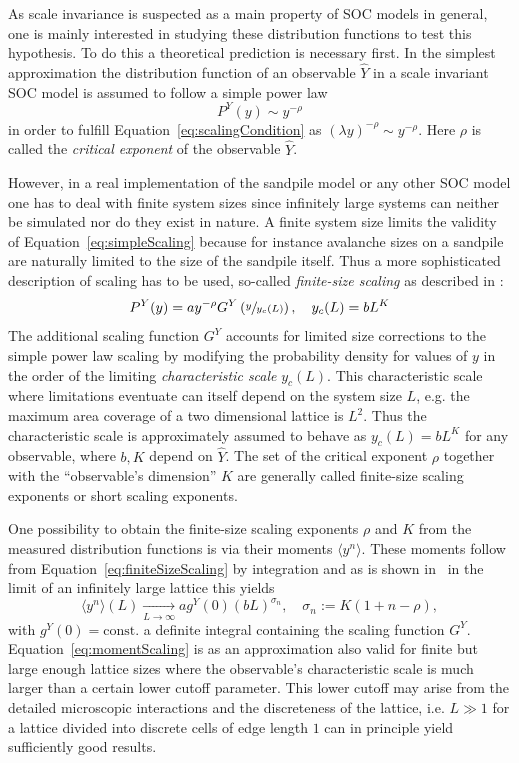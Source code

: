 As scale invariance is suspected as a main property of SOC models in general, one is mainly interested in studying
these distribution functions to test this hypothesis. To do this a theoretical prediction is necessary first.
In the simplest approximation the distribution function of an observable $\hat{Y}$ in a scale invariant SOC model
is assumed to follow a simple power law
\begin{equation}\label{eq:simpleScaling}
P^{Y}(y) \sim y^{-\rho}
\end{equation}
in order to fulfill Equation~\eqref{eq:scalingCondition} as $(\lambda y)^{-\rho}\sim y^{-\rho}$.
Here $\rho$ is called the \emph{critical exponent} of the observable $\hat{Y}$.

However, in a real implementation of the sandpile model or any other SOC model one has to deal with finite system sizes
since infinitely large systems can neither be simulated nor do they exist in nature.
A finite system size limits the validity of Equation~\eqref{eq:simpleScaling} because for instance avalanche sizes on a
sandpile are naturally limited to the size of the sandpile itself. Thus a more sophisticated description of scaling
has to be used, so-called \emph{finite-size scaling} as described in \cite{SOC-book}:
\begin{equation}\label{eq:finiteSizeScaling}
P^{Y}(y) = a y^{-\rho} G^{Y}\left(\sfrac{y}{y_c(L)}\right), \quad y_c(L)=b L^K
\end{equation}
The additional scaling function $G^{Y}$ accounts for limited size corrections to the simple power law scaling
by modifying the probability density for values of $y$ in the order of the limiting \emph{characteristic scale}
$y_c(L)$. This characteristic scale where limitations eventuate can itself depend on the system size $L$,
e.g. the maximum area coverage of a two dimensional lattice is $L^2$. Thus the characteristic scale is approximately
assumed to behave as $y_c(L)=b L^K$ for any observable, where $b,K$ depend on $\hat{Y}$.
The set of the critical exponent $\rho$ together with the \enquote{observable's dimension} $K$ are
generally called finite-size scaling exponents or short scaling exponents.

One possibility to obtain the finite-size scaling exponents $\rho$ and $K$ from the measured distribution functions
is via their moments $\langle y^n\rangle$. These moments follow from Equation~\eqref{eq:finiteSizeScaling} by integration
and as is shown in~\cite{SOC-book} in the limit of an infinitely large lattice this yields
\begin{equation}\label{eq:momentScaling}
\langle y^n\rangle(L) \xrightarrow[L\to\infty]{} a g^{Y}(0) (bL)^{\sigma_n},\quad \sigma_n := K(1+n-\rho),
\end{equation}
with $g^{Y}(0)=\mathrm{const.}$ a definite integral containing the scaling function $G^{Y}$.
Equation~\ref{eq:momentScaling} is as an approximation also valid for finite but large enough lattice sizes where
the observable's characteristic scale is much larger than a certain lower cutoff parameter. This lower cutoff may arise
from the detailed microscopic interactions and the discreteness of the lattice, i.e. $L \gg 1$ for a lattice divided
into discrete cells of edge length $1$ can in principle yield sufficiently good results.


